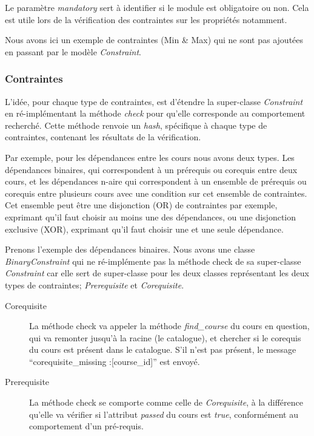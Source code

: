 Le paramètre \textit{mandatory} sert à identifier si le module est obligatoire ou non. Cela est utile lors de la vérification des contraintes sur les propriétés notamment. 

Nous avons ici un exemple de contraintes (Min \& Max) qui ne sont pas ajoutées en passant par le modèle \textit{Constraint}. 


\subsubsection{Contraintes}
L'idée, pour chaque type de contraintes, est d'étendre la super-classe \textit{Constraint} en ré-implémentant la méthode \textit{check} pour qu'elle corresponde au comportement recherché. Cette méthode renvoie un \textit{hash}, spécifique à chaque type de contraintes, contenant les résultats de la vérification.

Par exemple, pour les dépendances entre les cours nous avons deux types. Les dépendances binaires, qui correspondent à un prérequis ou corequis entre deux cours, et les dépendances n-aire qui correspondent à un ensemble de prérequis ou corequis entre plusieurs cours avec une condition sur cet ensemble de contraintes. Cet ensemble peut être une disjonction (OR) de contraintes par exemple, exprimant qu'il faut choisir au moins une des dépendances, ou une disjonction exclusive (XOR), exprimant qu'il faut choisir une et une seule dépendance. 

Prenons l'exemple des dépendances binaires. Nous avons une classe \textit{BinaryConstraint} qui ne ré-implémente pas la méthode check de sa super-classe \textit{Constraint} car elle sert de super-classe pour les deux classes représentant les deux types de contraintes; \textit{Prerequisite} et \textit{Corequisite}. 

\begin{description}
  \item[Corequisite] La méthode check va appeler la méthode \textit{find\_course} du cours en question, qui va remonter jusqu'à la racine (le catalogue), et chercher si le corequis du cours est présent dans le catalogue. S'il n'est pas présent, le message ``corequisite\_missing :[course\_id]'' est envoyé.
  \item[Prerequisite] La méthode check se comporte comme celle de \textit{Corequisite}, à la différence qu'elle va vérifier si l'attribut \textit{passed} du cours est \textit{true}, conformément au comportement d'un pré-requis. 
\end{description}

